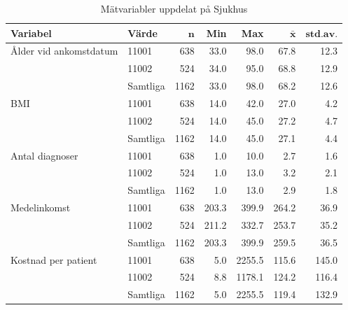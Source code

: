 \begin{table}[htbp]
\centering
\caption{Mätvariabler uppdelat på Sjukhus} 
\label{tab:sh1}
{\footnotesize
\begin{tabular}{llrrrrr}
 \textbf{Variabel} & \textbf{Värde} & $\mathbf{n}$ & \textbf{Min} & \textbf{Max} & $\mathbf{\bar{x}}$ & $\mathbf{std.av.}$ \\ 
  \hline
Ålder vid ankomstdatum & 11001 &  638 &  33.0 &   98.0 &  67.8 &  12.3 \\ 
   & 11002 &  524 &  34.0 &   95.0 &  68.8 &  12.9 \\ 
   \hline
 & Samtliga & 1162 &  33.0 &   98.0 &  68.2 &  12.6 \\ 
   \hline
BMI & 11001 &  638 &  14.0 &   42.0 &  27.0 &   4.2 \\ 
   & 11002 &  524 &  14.0 &   45.0 &  27.2 &   4.7 \\ 
   \hline
 & Samtliga & 1162 &  14.0 &   45.0 &  27.1 &   4.4 \\ 
   \hline
Antal diagnoser & 11001 &  638 &   1.0 &   10.0 &   2.7 &   1.6 \\ 
   & 11002 &  524 &   1.0 &   13.0 &   3.2 &   2.1 \\ 
   \hline
 & Samtliga & 1162 &   1.0 &   13.0 &   2.9 &   1.8 \\ 
   \hline
Medelinkomst & 11001 &  638 & 203.3 &  399.9 & 264.2 &  36.9 \\ 
   & 11002 &  524 & 211.2 &  332.7 & 253.7 &  35.2 \\ 
   \hline
 & Samtliga & 1162 & 203.3 &  399.9 & 259.5 &  36.5 \\ 
   \hline
Kostnad per patient & 11001 &  638 &   5.0 & 2255.5 & 115.6 & 145.0 \\ 
   & 11002 &  524 &   8.8 & 1178.1 & 124.2 & 116.4 \\ 
   \hline
 & Samtliga & 1162 &   5.0 & 2255.5 & 119.4 & 132.9 \\ 
   \hline
\end{tabular}
}

\end{table}

